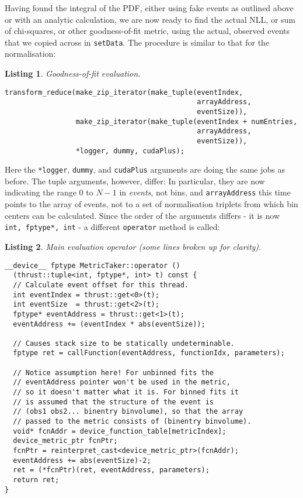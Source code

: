 \documentclass[12pt,pdflatex]{article}
\newtheorem{listing}{Listing}
\begin{document}
Having found the integral of the PDF, either using fake events as outlined above
or with an analytic calculation, we are now ready to find the actual NLL, or sum of
chi-squares, or other goodness-of-fit metric, using the actual, observed events that
we copied across in \texttt{setData}. The procedure is similar to that for the normalisation:
\begin{listing}
\label{listing:nlleval}
Goodness-of-fit evaluation.

\begin{verbatim}
transform_reduce(make_zip_iterator(make_tuple(eventIndex, 
                                              arrayAddress, 
                                              eventSize)),
                 make_zip_iterator(make_tuple(eventIndex + numEntries, 
                                              arrayAddress, 
                                              eventSize)),
                 *logger, dummy, cudaPlus);   
\end{verbatim}
\end{listing}

Here the \verb|*logger|, \verb|dummy|, and \verb|cudaPlus| arguments are doing
the same jobs as before. The tuple arguments, however, differ: In particular,
they are now indicating the range 0 to $N-1$ in \emph{events}, not bins, and
\verb|arrayAddress| this time points to the array of events, not to a set of 
normalisation triplets from which bin centers can be calculated. Since the order
of the arguments differs - it is now \verb|int, fptype*, int| - a different 
\texttt{operator} method is called: 
\begin{listing}
\label{listing:maineval} 
Main evaluation operator (some lines broken up for clarity). 

\begin{verbatim}
__device__ fptype MetricTaker::operator () 
  (thrust::tuple<int, fptype*, int> t) const {
  // Calculate event offset for this thread. 
  int eventIndex = thrust::get<0>(t);
  int eventSize  = thrust::get<2>(t);
  fptype* eventAddress = thrust::get<1>(t);
  eventAddress += (eventIndex * abs(eventSize)); 

  // Causes stack size to be statically undeterminable.
  fptype ret = callFunction(eventAddress, functionIdx, parameters);

  // Notice assumption here! For unbinned fits the 
  // eventAddress pointer won't be used in the metric, 
  // so it doesn't matter what it is. For binned fits it 
  // is assumed that the structure of the event is 
  // (obs1 obs2... binentry binvolume), so that the array
  // passed to the metric consists of (binentry binvolume). 
  void* fcnAddr = device_function_table[metricIndex];
  device_metric_ptr fcnPtr;
  fcnPtr = reinterpret_cast<device_metric_ptr>(fcnAddr);
  eventAddress += abs(eventSize)-2;
  ret = (*fcnPtr)(ret, eventAddress, parameters);
  return ret; 
}
\end{verbatim}
\end{listing}
\end{document}

